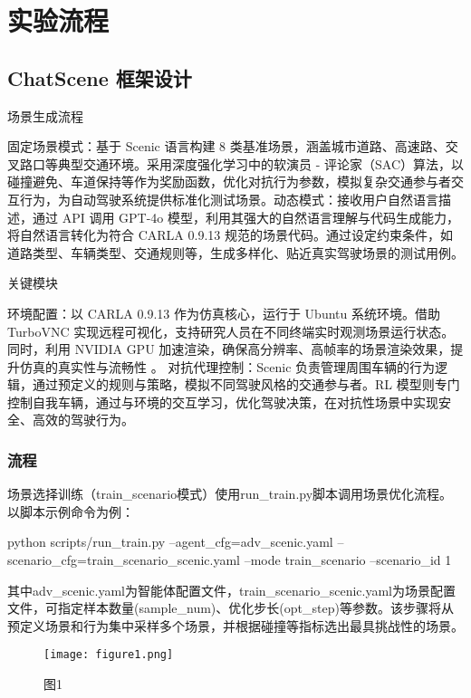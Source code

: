 \chapter{实验流程}

\section{ChatScene 框架设计}

场景生成流程

固定场景模式：基于 Scenic 语言构建 8 类基准场景，涵盖城市道路、高速路、交叉路口等典型交通环境。采用深度强化学习中的软演员 - 评论家（SAC）算法，以碰撞避免、车道保持等作为奖励函数，优化对抗行为参数，模拟复杂交通参与者交互行为，为自动驾驶系统提供标准化测试场景。​
动态模式：接收用户自然语言描述，通过 API 调用 GPT-4o 模型，利用其强大的自然语言理解与代码生成能力，将自然语言转化为符合 CARLA 0.9.13 规范的场景代码。通过设定约束条件，如道路类型、车辆类型、交通规则等，生成多样化、贴近真实驾驶场景的测试用例。


关键模块

环境配置：以 CARLA 0.9.13 作为仿真核心，运行于 Ubuntu 系统环境。借助 TurboVNC 实现远程可视化，支持研究人员在不同终端实时观测场景运行状态。同时，利用 NVIDIA GPU 加速渲染，确保高分辨率、高帧率的场景渲染效果，提升仿真的真实性与流畅性 。​
对抗代理控制：Scenic 负责管理周围车辆的行为逻辑，通过预定义的规则与策略，模拟不同驾驶风格的交通参与者。RL 模型则专门控制自我车辆，通过与环境的交互学习，优化驾驶决策，在对抗性场景中实现安全、高效的驾驶行为。

\subsection{流程}
场景选择训练（train\_scenario模式）使用run\_train.py脚本调用场景优化流程。以脚本示例命令为例：

python scripts/run\_train.py --agent\_cfg=adv\_scenic.yaml --scenario\_cfg=train\_scenario\_scenic.yaml --mode train\_scenario --scenario\_id 1

其中adv\_scenic.yaml为智能体配置文件，train\_scenario\_scenic.yaml为场景配置文件，可指定样本数量(sample\_num)、优化步长(opt\_step)等参数。该步骤将从预定义场景和行为集中采样多个场景，并根据碰撞等指标选出最具挑战性的场景。

\begin{figure}[htbp]
	\centering
	\texttt{[image: figure1.png]} %
	\caption{图1} %
	\label{fig:example} %
\end{figure}


